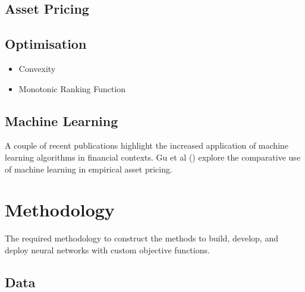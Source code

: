 \documentclass[12pt]{article}
\begin{document}
\subsection{Asset Pricing}
\subsection{Optimisation}
\begin{itemize}
	\item Convexity
	\item Monotonic Ranking Function
\end{itemize}
\subsection{Machine Learning}
A couple of recent publications highlight the increased application of machine learning algorithms in financial contexts.
\cite{corporate-culture}
Gu et al (\citeyear{eapvml}) explore the comparative use of machine learning in empirical asset pricing.
\newpage
\section{Methodology}
The required methodology to construct the methods to build, develop, and deploy neural networks with custom objective functions.
\subsection{Data}\label{data}
\end{document}
